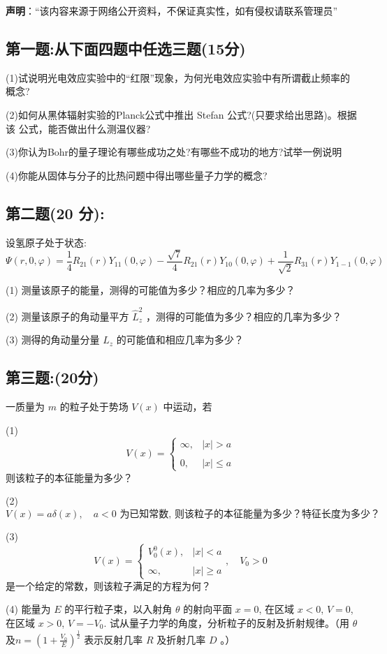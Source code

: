 
\textbf{声明}：“该内容来源于网络公开资料，不保证真实性，如有侵权请联系管理员”

\subsection{第一题:从下面四题中任选三题(15分)}

(1)试说明光电效应实验中的“红限”现象，为何光电效应实验中有所谓截止频率的概念?

(2)如何从黑体辐射实验的Planck公式中推出 Stefan 公式?(只要求给出思路)。根据该
公式，能否做出什么测温仪器?

(3)你认为Bohr的量子理论有哪些成功之处?有哪些不成功的地方?试举一例说明

(4)你能从固体与分子的比热问题中得出哪些量子力学的概念?
\subsection{第二题(20 分):}
设氢原子处于状态:
\[\Psi(r,  0, \varphi) = \frac{1}{4} R_{21}(r) Y_{11}(0, \varphi) - \frac{\sqrt{7}}{4} R_{21}(r) Y_{10}(0, \varphi) + \frac{1}{\sqrt{2}} R_{31}(r) Y_{1-1}(0, \varphi)~\]

(1) 测量该原子的能量，测得的可能值为多少？相应的几率为多少？

(2) 测量该原子的角动量平方 $\hat{L}_z^2$ ，测得的可能值为多少？相应的几率为多少？

(3) 测得的角动量分量 $L_z$ 的可能值和相应几率为多少？
\subsection{第三题:(20分)}
一质量为 $m$ 的粒子处于势场 $V(x)$ 中运动，若

(1) 
\[V(x) = \begin{cases} \infty, & |x| > a \\\\0, & |x| \leq a \end{cases}~\]
则该粒子的本征能量为多少？

(2) 
\[V(x) = a \delta(x), \quad a < 0 \text{ 为已知常数, 则该粒子的本征能量为多少？特征长度为多少？}~\]

(3) 
\[V(x) = \begin{cases} V_0^0(x), & |x| < a \\\\\infty, & |x| \geq a \end{cases}, \quad V_0 > 0~\]
是一个给定的常数，则该粒子满足的方程为何？

(4) 
能量为 $E$ 的平行粒子束，以入射角 $\theta$ 的射向平面 $x = 0$, 在区域 $x < 0$, $V = 0$, 在区域 $x > 0$, $V = -V_0$. 试从量子力学的角度，分析粒子的反射及折射规律。（用 $\theta$ 及$n = \left( 1 + \frac{V_0}{E} \right)^{\frac{1}{2}}$
表示反射几率 $R$ 及折射几率 $D$ 。）